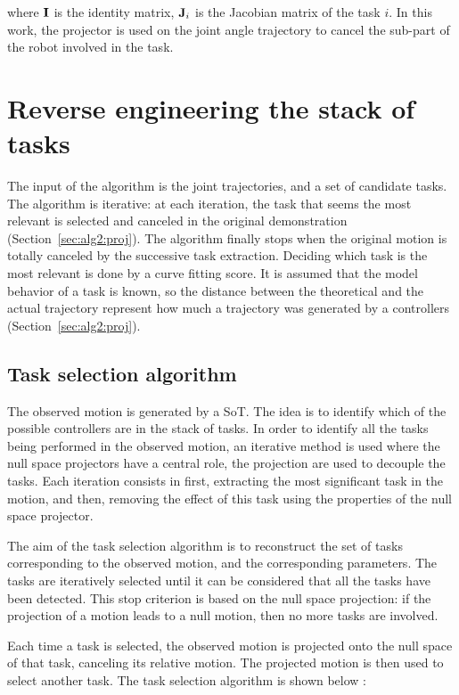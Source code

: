 \documentclass[letterpaper, 10pt, conference]{ieeeconf}      %
\begin{document}
\noindent where ${\mathbf{I}}$ is the identity matrix, ${\mathbf{J}}_i$ is the Jacobian matrix
of the task $i$. In this work, the projector is used on
the joint angle trajectory to cancel the sub-part of the robot involved in the task.

\section{Reverse engineering the stack of tasks} \label{sec:detect}

The input of the algorithm is the joint trajectories, and a set of candidate
tasks. The algorithm is iterative: at each iteration, the task that seems the
most relevant is selected and canceled in the original demonstration (Section~\ref{sec:alg2:proj}).
The algorithm finally stops when the original
motion is totally canceled by the successive task extraction. Deciding which
task is the most relevant is done by a curve fitting score. 
It is assumed that the model behavior of a task is known, so the distance between
the theoretical and the actual trajectory represent how much a trajectory
was generated by a controllers (Section~\ref{sec:alg2:proj}).

\subsection{Task selection algorithm} \label{sec:alg1:selec}
The observed motion is generated by a SoT.  The idea is to identify which of the possible controllers are in the stack of tasks. 
In order to identify all the
tasks being performed in the observed motion, an iterative method is used where
the null space projectors have a central role, the projection
are used to decouple the tasks.
Each iteration consists in first, extracting the most significant task in the motion,
and then, removing the effect of this task using the properties of the null space projector.

The aim of the task selection algorithm is to reconstruct the set of tasks corresponding
to the observed motion, and the corresponding parameters.
The tasks are iteratively selected until it can be considered that all the tasks
have been detected.
This stop criterion is based on the
null space projection: if the projection of a motion
leads to a null motion, then no more tasks are involved.

Each time a task is selected, the observed motion is projected
onto the null space of that task, canceling its relative motion. 
The projected motion is then used to select another task.
The task selection algorithm is shown below :
\end{document}
